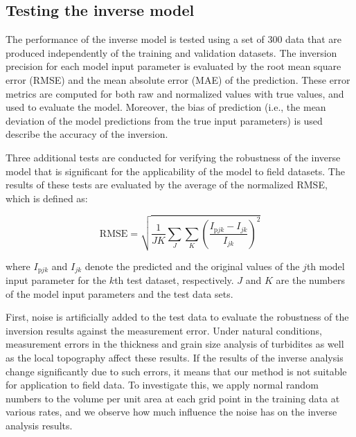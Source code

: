\subsection{Testing the inverse model}

The performance of the inverse model is tested using a set of 300 data that are produced independently of the training and validation datasets. The inversion precision for each model input parameter is evaluated by the root mean square error (RMSE) and the mean absolute error (MAE) of the prediction. These error metrics are computed for both raw and normalized values with true values, and used to evaluate the model. Moreover, the bias of prediction (i.e., the mean deviation of the model predictions from the true input parameters) is used describe the accuracy of the inversion. 

Three additional tests are conducted for verifying the robustness of the inverse model that is significant for the applicability of the model to field datasets. The results of these tests are evaluated by the average of the normalized RMSE, which is defined as:

\begin{equation}
  \mathrm{RMSE} = \sqrt{ \frac{1}{JK} \sum_J \sum_K {\left( \frac{I_{\mathrm{p}jk} - I_{jk}}{I_{jk}} \right)^2} }
  \label{eq:RMSE}
\end{equation}

\noindent where $I_{\mathrm{p}jk}$ and $I_{jk}$ denote the predicted and the original values of the $j$th model input parameter for the $k$th test dataset, respectively. $J$ and $K$ are the numbers of the model input parameters and the test data sets.

First, noise is artificially added to the test data to evaluate the robustness of the inversion results against the measurement error. Under natural conditions, measurement errors in the thickness and grain size analysis of turbidites as well as the local topography  affect these results. If the results of the inverse analysis change significantly due to such errors, it means that our method is not suitable for application to field data. To investigate this, we apply normal random numbers to the volume per unit area at each grid point in the training data at various rates, and we observe how much influence the noise has on the inverse analysis results.

